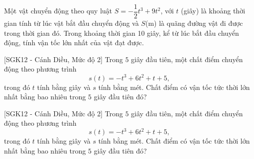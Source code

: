 \begin{bt}%
	Một vật chuyển động theo quy luật $S=-\dfrac{1}{2} t^3+9 t^2$, với $t$ (giây) là khoảng thời gian tính từ lúc vật bắt đầu chuyển động và $S$(m) là quãng đường vật đi được trong thời gian đó. Trong khoảng thời gian 10 giây, kể từ lúc  bắt đầu chuyển động, tính vận tốc lớn nhất của vật đạt được.
\end{bt}

\begin{bt}%
[SGK12 - Cánh Diều, Mức độ 2]%
	Trong $5$ giây đầu tiên, một chất điểm chuyển động theo phương trình $$s(t)=-t^3+6t^2+t+5,$$ trong đó $t$ tính bằng giây và $s$ tính bằng mét. Chất điểm có vận tốc tức thời lớn nhất bằng bao nhiêu trong $5$ giây đầu tiên đó?
\end{bt}

\begin{bt}%
[SGK12 - Cánh Diều, Mức độ 2]%
	Trong $5$ giây đầu tiên, một chất điểm chuyển động theo phương trình $$s(t)=-t^3+6t^2+t+5,$$ trong đó $t$ tính bằng giây và $s$ tính bằng mét. Chất điểm có vận tốc tức thời lớn nhất bằng bao nhiêu trong $5$ giây đầu tiên đó?
\end{bt}

